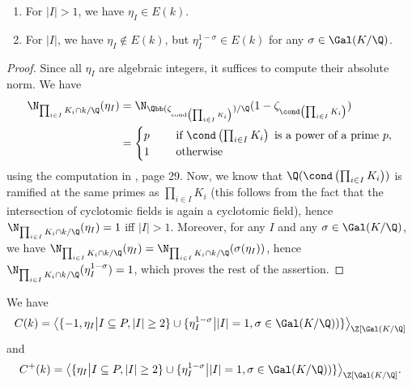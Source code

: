 \begin{lemma}\leavevmode \label{units}
\begin{enumerate}%
\item For $|I|>1$, we have $\eta_I\in E(k)$.
\item For $|I|$, we have $\eta_I\not\in E(k)$, but $\eta_I^{1-\sigma}\in E(k)$ for any $\sigma\in \Gal(K/\Q)$. %
\end{enumerate}
\end{lemma}
\begin{proof}
Since all $\eta_I$ are algebraic integers, it suffices to compute their absolute norm. We have 
\begin{align*}
\N_{\prod_{i\in I}K_i\cap k/\Q}(\eta_I)&=\N_{\Qbb(\zeta_{\text{cond} \left(\prod_{i\in I}K_i\right)})/\Q}
(1-\zeta_{\cond\left(\prod_{i\in I}K_i\right)})\\
&=\begin{cases}
p & \quad \text{ if } \cond\left(\prod_{i\in I}K_i\right) \text{ is a power of a prime } p,\\
1 & \quad \text{ otherwise } \\
\end{cases}
\end{align*}
using the computation in \citep{Sedlacek2015thesis}, page 29. Now, we know that $\Q(\cond\left(\prod_{i\in I}K_i\right))$ is ramified at the same primes as $\prod_{i\in I}K_i$ (this follows from the fact that the intersection of cyclotomic fields is again a cyclotomic field), hence $\N_{\prod_{i\in I}K_i\cap k/\Q}(\eta_I)=1$ iff $|I|>1$. Moreover, for any $I$ and any $\sigma\in \Gal(K/\Q)$, we have $\N_{\prod_{i\in I}K_i\cap k/\Q}(\eta_I)=\N_{\prod_{i\in I}K_i\cap k/\Q}(\sigma(\eta_I))$, hence $\N_{\prod_{i\in I}K_i\cap k/\Q}(\eta_I^{1-\sigma})=1$, which proves the rest of the assertion.
\end{proof}

\begin{cor}
We have $$C(k)=\big\langle \{ -1, \eta_I \big\vert I \subseteq P,  |I|\geq 2\} \cup \{\eta_I^{1-\sigma} \big\vert |I|=1, \sigma\in \Gal(K/\Q))\}\big\rangle_{\Z[\Gal(K/\Q]}$$
and
$$C^+(k)=\big\langle \{ \eta_I \big\vert I \subseteq P,  |I|\geq 2\} \cup \{\eta_I^{1-\sigma} \big\vert |I|=1, \sigma\in \Gal(K/\Q))\}\big\rangle_{\Z[\Gal(K/\Q]}.$$
\end{cor}

